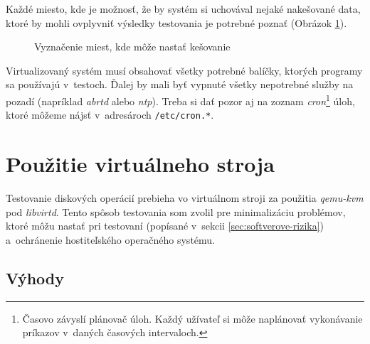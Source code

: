 Každé miesto, kde je možnosť, že by systém si uchovával nejaké nakešované data,
ktoré by mohli ovplyvniť výsledky testovania je potrebné poznať (Obrázok
\ref{graf-cache}).

\begin{figure}[ht]
\begin{center}
  \caption{Vyznačenie miest, kde môže nastať kešovanie}
  \label{graf-cache}
\end{center}
\end{figure}

Virtualizovaný systém musí obsahovať všetky potrebné balíčky, ktorých programy
sa používajú v~testoch. Ďalej by mali byť vypnuté všetky nepotrebné služby na
pozadí (napríklad \emph{abrtd} alebo \emph{ntp}). Treba si dať pozor aj na
zoznam \emph{cron}\footnote{Časovo závyslí plánovač úloh. Každý užívateľ si
môže naplánovať vykonávanie príkazov v~daných časových intervaloch.} úloh,
ktoré môžeme nájsť v~adresároch \texttt{/etc/cron.*}.

%
%

\section{Použitie virtuálneho stroja}
\label{sec:virtual-machine}

Testovanie diskových operácií prebieha vo virtuálnom stroji za použitia
\emph{qemu-kvm} pod \emph{libvirtd}. Tento spôsob testovania som zvolil pre
minimalizáciu problémov, ktoré môžu nastať pri testovaní (popísané v~sekcii
\ref{sec:softverove-rizika}) a~ochránenie hostiteľského operačného systému.

\subsection{Výhody}

